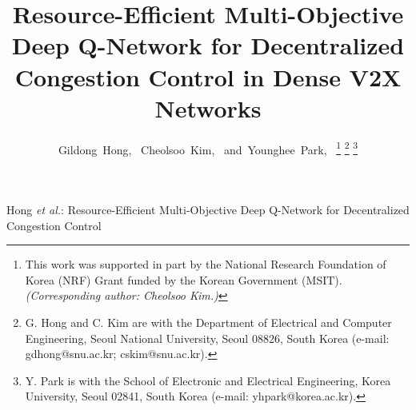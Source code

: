 \documentclass[journal]{IEEEtran}
\begin{document}
\title{Resource-Efficient Multi-Objective Deep Q-Network for Decentralized Congestion Control in Dense V2X Networks}

\author{Gildong~Hong,~
        Cheolsoo~Kim,~
        and~Younghee~Park,~%
\thanks{This work was supported in part by the National Research Foundation of Korea (NRF) Grant funded by the Korean Government (MSIT). \textit{(Corresponding author: Cheolsoo Kim.)}}%
\thanks{G. Hong and C. Kim are with the Department of Electrical and Computer Engineering, Seoul National University, Seoul 08826, South Korea (e-mail: gdhong@snu.ac.kr; cskim@snu.ac.kr).}%
\thanks{Y. Park is with the School of Electronic and Electrical Engineering, Korea University, Seoul 02841, South Korea (e-mail: yhpark@korea.ac.kr).}%
}

%
{Hong \MakeLowercase{\textit{et al.}}: Resource-Efficient Multi-Objective Deep Q-Network for Decentralized Congestion Control}

\maketitle
\end{document}
